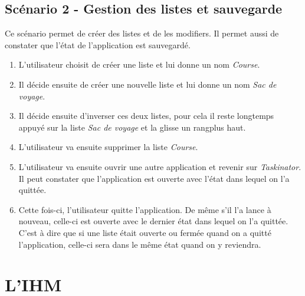 \documentclass[a4paper,10pt]{article}
\begin{document}
\subsection{Scénario 2 - Gestion des listes et sauvegarde}
Ce scénario permet de créer des listes et de les modifiers. Il permet aussi de constater que l'état de l'application est sauvegardé.
\begin{enumerate}
\item{L'utilisateur choisit de créer une liste et lui donne un nom \textit{Course}.}
\item{Il décide ensuite de créer une nouvelle liste et lui donne un nom \textit{Sac de voyage}.}
\item{Il décide ensuite d'inverser ces deux listes, pour cela il reste longtemps appuyé sur la liste \textit{Sac de voyage} et la glisse un rangplus haut.}
\item{L'utilisateur va ensuite supprimer la liste \textit{Course}.}
\item{L'utilisateur va ensuite ouvrir une autre application et revenir sur \textit{Taskinator}. Il peut constater que l'application est ouverte avec l'état dans lequel on l'a quittée.}
\item{Cette fois-ci, l'utilisateur quitte l'application. De même s'il l'a lance à nouveau, celle-ci est ouverte avec le dernier état dans lequel on l'a quittée. C'est à dire que si une liste était ouverte ou fermée quand on a quitté l'application, celle-ci sera dans le même état quand on y reviendra.}
\end{enumerate}


\newpage
\section{L'IHM}
\end{document}
